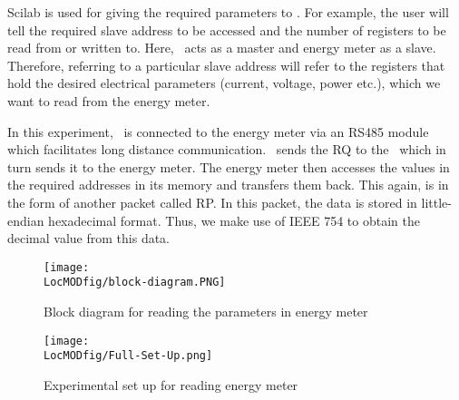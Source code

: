 Scilab is used for giving the required parameters to \arduino. For
example, the user will tell the required slave address to be accessed
and the number of registers to be read from or written to. Here,
\arduino\ acts as a master and energy meter as a slave. Therefore,
referring to a particular slave address will refer to the registers
that hold the desired electrical parameters (current, voltage, power
etc.), which we want to read from the energy meter.

In this experiment, \arduino\ is connected to the energy meter via 
an RS485 module which facilitates long distance communication. 
\scilab\ sends the RQ to the \arduino\, which in turn sends it to the
energy meter. The energy meter then accesses the values in the
required addresses in its memory and transfers them back. This again,
is in the form of another packet called RP. In this packet, the data is stored in 
little-endian hexadecimal format. Thus, we make use of IEEE 754 to obtain the 
decimal value from this data. 



\begin{figure}
  \centering
  \texttt{[image: \\LocMODfig/block-diagram.PNG]}
  \caption{Block diagram for reading the parameters in energy meter}
  \label{fig:block-diagram}
\end{figure}

\begin{figure}
  \centering
  \texttt{[image: \\LocMODfig/Full-Set-Up.png]}
  \caption{Experimental set up for reading energy meter}
  \label{fig:full-set-up}
\end{figure}

